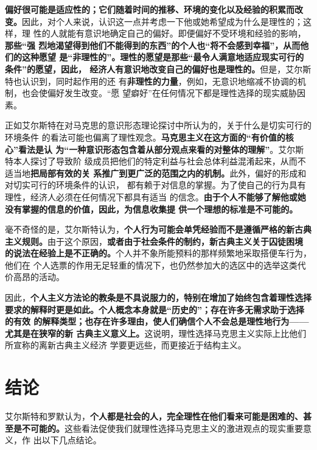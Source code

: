 \textbf{偏好很可能是适应性的；它们随着时间的推移、环境的变化以及经验的积累而改
  变。}因此，对个人来说，认识这一点并考虑一下他或她希望成为什么是理性的；这样，理
性的人就能有意识地确定自己的偏好。即便偏好不受环境和经验的影响，\textbf{那些“强
  烈地渴望得到他们不能得到的东西”的个人也“将不会感到幸福”，从而他们的这种愿望
  是“非理性的”。理性的愿望是那些“最令人满意地适应现实可行的条件”的愿望，因此，
  经济人有意识地改变自己的偏好也是理性的。}但是，艾尔斯特也认识到，同时起作用的还
有\textbf{非理性的力量}，例如，无意识地缩减不协调的机制，也会使偏好发生改变。“愿
望癖好”在任何情况下都是理性选择的现实威胁因素。

正如艾尔斯特在对马克思的意识形态理论探讨中所认为的，关于什么是切实可行的环境条件
的看法可能也偏离了理性观念。\textbf{马克思主义在这方面的“有价值的核心”看法是认
  为“一种意识形态包含着从部分观点来看的对整体的理解”}。艾尔斯特本人探讨了导致阶
级成员把他们的特定利益与社会总体利益混淆起来，从而不适当地\textbf{把局部有效的关
  系推广到更广泛的范围之内的机制。}此外，偏好的形成和对切实可行的环境条件的认识，
都有赖于对信息的掌握。为了使自己的行为具有理性，经济人必须在任何情况下都具有适当
的信念。\textbf{由于个人不能够了解他或她没有掌握的信息的价值，因此，为信息收集提
  供一个理想的标准是不可能的。}

毫不奇怪的是，艾尔斯特认为，\textbf{个人行为可能会单凭经验而不是遵循严格的新古典
  主义规则。}由于这个原因，\textbf{或者由于社会条件的制约，新古典主义关于囚徒困境
  的说法在经验上是不正确的。}个人并不象所能预料的那样频繁地采取搭便车行为，他们在
个人选票的作用无足轻重的情况下，也仍然参加大的选区中的选举这类代价高昂的活动。

因此，\textbf{个人主义方法论的教条是不具说服力的，特别在增加了始终包含着理性选择
  要求的解释时更是如此。个人概念本身就是“历史的”；存在许多无需求助于选择的有效
  的解释类型；也存在许多理由，使人们确信个人不会总是理性地行为——尤其是在狭窄的新
  古典主义意义上。}这说明，理性选择马克思主义实际上比他们所宣称的离新古典主义经济
学要更远些，而更接近于结构主义。

\section{结论}

艾尔斯特和罗默认为，\textbf{个人都是社会的人，完全理性在他们看来可能是困难的、甚
  至是不可能的。}这些看法促使我们就理性选择马克思主义的激进观点的现实重要意义，作
出以下几点结论。

